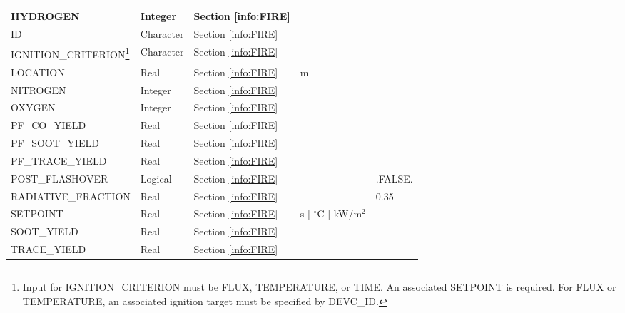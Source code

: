 \begin{minipage}{6.5in}
\begin{longtable}{@{\extracolsep{\fill}}|l|l|l|l|l|}
{\ct HYDROGEN}             & Integer     & Section \ref{info:FIRE}                 &                             &                 \\ \hline
{\ct ID}                   & Character   & Section \ref{info:FIRE}                 &                             &                 \\ \hline
{\ct IGNITION\_CRITERION}\footnote{Input for {\ct IGNITION\_CRITERION} must be {\ct FLUX}, {\ct TEMPERATURE}, or {\ct TIME}. An associated {\ct SETPOINT} is required. For {\ct FLUX} or {\ct TEMPERATURE}, an associated ignition target must be specified by {\ct DEVC\_ID}.}
                           & Character   & Section \ref{info:FIRE}                 &                             &                 \\ \hline
{\ct LOCATION}             & Real        & Section \ref{info:FIRE}                 & m                           &                 \\ \hline
{\ct NITROGEN}             & Integer     & Section \ref{info:FIRE}                 &                             &                 \\ \hline
{\ct OXYGEN}               & Integer     & Section \ref{info:FIRE}                 &                             &                 \\ \hline
{\ct PF\_CO\_YIELD}        & Real        & Section \ref{info:FIRE}                 &                             &                 \\ \hline
{\ct PF\_SOOT\_YIELD}      & Real        & Section \ref{info:FIRE}                 &                             &                 \\ \hline
{\ct PF\_TRACE\_YIELD}     & Real        & Section \ref{info:FIRE}                 &                             &                 \\ \hline
{\ct POST\_FLASHOVER}      & Logical     & Section \ref{info:FIRE}                 &                             &  {\ct .FALSE.}  \\ \hline
{\ct RADIATIVE\_FRACTION}  & Real        & Section \ref{info:FIRE}                 &                             &     0.35        \\ \hline
{\ct SETPOINT}             & Real        & Section \ref{info:FIRE}                 & s $\mid$ $^\circ$C $\mid$ kW/m$^2$  &         \\ \hline
{\ct SOOT\_YIELD}          & Real        & Section \ref{info:FIRE}                 &                             &                 \\ \hline
{\ct TRACE\_YIELD}         & Real        & Section \ref{info:FIRE}                 &                             &                 \\ \hline
\end{longtable}
\end{minipage}



